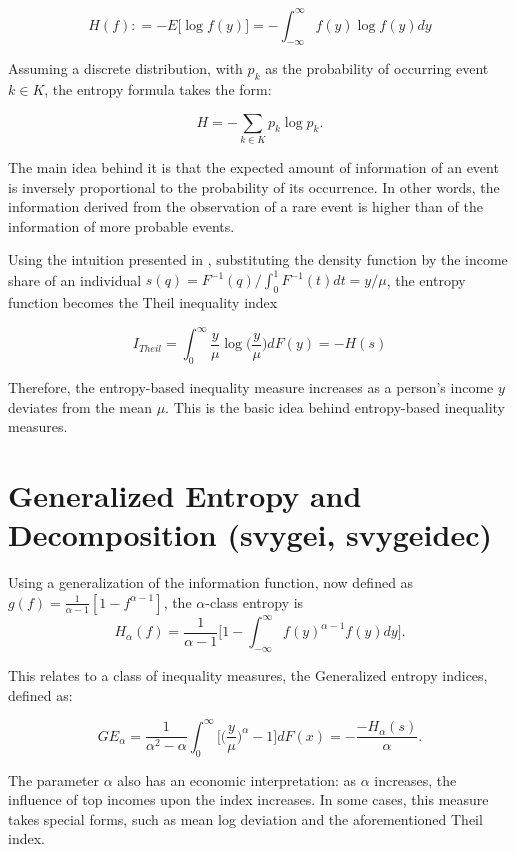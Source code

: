 \documentclass[]{book}
\theoremstyle{definition}
\theoremstyle{definition}
\theoremstyle{remark}
\begin{document}
\[
H(f) \colon = -E \big[ \log f(y) \big] = - \int_{-\infty}^{\infty} f(y) \log f(y) dy
\]

Assuming a discrete distribution, with \(p_k\) as the probability of
occurring event \(k \in K\), the entropy formula takes the form:

\[
H = - \sum_{k \in K} p_k \log p_k \text{.}
\]

The main idea behind it is that the expected amount of information of an
event is inversely proportional to the probability of its occurrence. In
other words, the information derived from the observation of a rare
event is higher than of the information of more probable events.

Using the intuition presented in \citep{cowell2009}, substituting the
density function by the income share of an individual
\(s(q) = {F}^{-1}(q) / \int_{0}^{1} F^{-1}(t)dt = y/\mu\), the entropy
function becomes the Theil inequality index

\[
I_{Theil} = \int_{0}^{\infty} \frac{y}{\mu} \log \bigg( \frac{y}{\mu} \bigg) dF(y) = -H(s)
\]

Therefore, the entropy-based inequality measure increases as a person's
income \(y\) deviates from the mean \(\mu\). This is the basic idea
behind entropy-based inequality measures.

\section{Generalized Entropy and Decomposition (svygei,
svygeidec)}\label{generalized-entropy-and-decomposition-svygei-svygeidec}

Using a generalization of the information function, now defined as
\(g(f) = \frac{1}{\alpha-1} [ 1 - f^{\alpha - 1} ]\), the
\(\alpha\)-class entropy is \[
H_\alpha(f) = \frac{1}{\alpha - 1} \bigg[ 1 - \int_{-\infty}^{\infty} f(y)^{ \alpha - 1} f(y) dy \bigg] \text{.}
\]

This relates to a class of inequality measures, the Generalized entropy
indices, defined as:

\[
GE_\alpha = \frac{1}{\alpha^2 - \alpha} \int_{0}^\infty \bigg[ \bigg( \frac{y}{\mu} \bigg)^\alpha - 1 \bigg]dF(x) = - \frac{-H_\alpha(s) }{ \alpha } \text{.}
\]

The parameter \(\alpha\) also has an economic interpretation: as
\(\alpha\) increases, the influence of top incomes upon the index
increases. In some cases, this measure takes special forms, such as mean
log deviation and the aforementioned Theil index.
\end{document}
